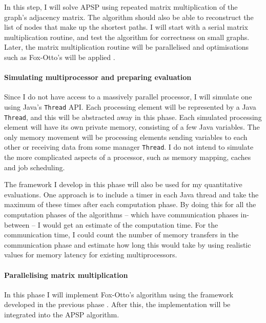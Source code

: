 \documentclass[../dissertation/diss.tex]{subfiles}
\begin{document}
In this step, I will solve APSP using repeated matrix multiplication of the
graph's adjacency matrix.  The algorithm should also be able to reconstruct the
list of nodes that make up the shortest paths. I will start with a serial
matrix multiplication routine, and test the algorithm for correctness on small
graphs. Later, the matrix multiplication routine will be parallelised and optimisations
such as Fox-Otto's will be applied \cite{fox}.

\paragraph{Simulating multiprocessor and preparing evaluation}%
\label{par:Simulating Multiprocessor}

Since I do not have access to a massively parallel processor, I will simulate
one using Java's \texttt{Thread} API.  Each processing element will be
represented by a Java \texttt{Thread}, and this will be abstracted away in this
phase. Each simulated processing element will have its own private memory,
consisting of a few Java variables. The only memory movement will be processing
elements sending variables to each other or receiving data from some manager
\texttt{Thread}. I do not intend to simulate the more complicated aspects of
a processor, such as memory mapping, caches and job scheduling.

The framework I develop in this phase will also be used for my quantitative
evaluations.  One approach is to include a timer in each Java thread and take
the maximum of these times after each computation phase. By doing this for all
the computation phases of the algorithms -- which have communication phases
in-between -- I would get an estimate of the computation time. For the
communication time, I could count the number of memory transfers in the
communication phase and estimate how long this would take by using realistic
values for memory latency for existing multiprocessors.

\paragraph{Parallelising matrix multiplication}%
\label{par:Parallelising Matrix Multiplication}

In this phase I will implement Fox-Otto's algorithm using the framework
developed in the previous phase \cite{fox}. After this, the
implementation will be integrated into the APSP algorithm.

\end{document}
